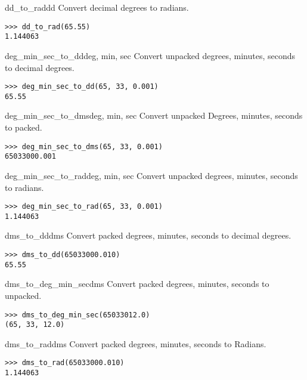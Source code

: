\documentclass{howto}
\begin{document}
\begin{funcdesc}{dd_to_rad}{dd}
   Convert decimal degrees to radians.

\begin{verbatim}
>>> dd_to_rad(65.55)
1.144063
\end{verbatim}
\end{funcdesc}

\begin{funcdesc}{deg_min_sec_to_dd}{deg, min, sec}
   Convert unpacked degrees, minutes, seconds to decimal degrees.

\begin{verbatim}
>>> deg_min_sec_to_dd(65, 33, 0.001)
65.55
\end{verbatim}
\end{funcdesc}

\begin{funcdesc}{deg_min_sec_to_dms}{deg, min, sec}
   Convert unpacked Degrees, minutes, seconds to packed.

\begin{verbatim}
>>> deg_min_sec_to_dms(65, 33, 0.001)
65033000.001
\end{verbatim}
\end{funcdesc}

\begin{funcdesc}{deg_min_sec_to_rad}{deg, min, sec}
    Convert unpacked degrees, minutes, seconds to radians.

\begin{verbatim}
>>> deg_min_sec_to_rad(65, 33, 0.001)
1.144063
\end{verbatim}
\end{funcdesc}

\begin{funcdesc}{dms_to_dd}{dms}
    Convert packed degrees, minutes, seconds to decimal degrees.

\begin{verbatim}
>>> dms_to_dd(65033000.010)
65.55
\end{verbatim}
\end{funcdesc}

\begin{funcdesc}{dms_to_deg_min_sec}{dms}
    Convert packed degrees, minutes, seconds to unpacked.

\begin{verbatim}
>>> dms_to_deg_min_sec(65033012.0)
(65, 33, 12.0)
\end{verbatim}
\end{funcdesc}

\begin{funcdesc}{dms_to_rad}{dms}
   Convert packed degrees, minutes, seconds to Radians.

\begin{verbatim}
>>> dms_to_rad(65033000.010)
1.144063
\end{verbatim}
\end{funcdesc}
\end{document}
